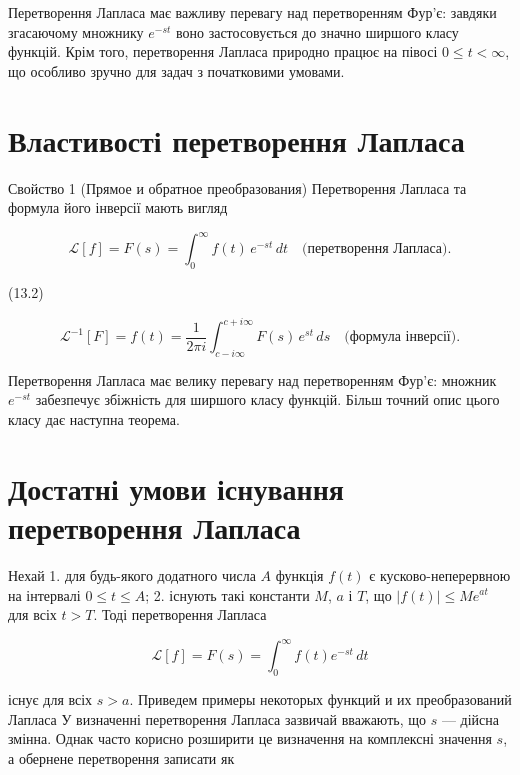 \documentclass[
  ukrainian,
]{article}
\begin{document}
Перетворення Лапласа має важливу перевагу над перетворенням Фур'є:
завдяки згасаючому множнику \(e^{-st}\) воно застосовується до значно
ширшого класу функцій. Крім того, перетворення Лапласа природно працює
на півосі \(0 \le t < \infty\), що особливо зручно для задач з
початковими умовами.

\section{Властивості перетворення
Лапласа}\label{ux432ux43bux430ux441ux442ux438ux432ux43eux441ux442ux456-ux43fux435ux440ux435ux442ux432ux43eux440ux435ux43dux43dux44f-ux43bux430ux43fux43bux430ux441ux430}

Свойство 1 (Прямое и обратное преобразования) Перетворення Лапласа та
формула його інверсії мають вигляд

\[
\mathscr{L}[f] = F(s) = \int_{0}^{\infty} f(t) \, e^{-st} \, dt
\quad \text{(перетворення Лапласа).}
\]

(13.2)

\[
\mathscr{L}^{-1}[F] = f(t) = \frac{1}{2\pi i} \int_{c-i\infty}^{c+i\infty} F(s) \, e^{st} \, ds
\quad \text{(формула інверсії).}
\]

Перетворення Лапласа має велику перевагу над перетворенням Фур'є:
множник \(e^{-st}\) забезпечує збіжність для ширшого класу функцій.
Більш точний опис цього класу дає наступна теорема.

\section{Достатні умови існування перетворення
Лапласа}\label{ux434ux43eux441ux442ux430ux442ux43dux456-ux443ux43cux43eux432ux438-ux456ux441ux43dux443ux432ux430ux43dux43dux44f-ux43fux435ux440ux435ux442ux432ux43eux440ux435ux43dux43dux44f-ux43bux430ux43fux43bux430ux441ux430}

Нехай 1. для будь-якого додатного числа \(A\) функція \(f(t)\) є
кусково-неперервною на інтервалі \(0 \le t \le A\); 2. існують такі
константи \(M\), \(a\) і \(T\), що \(|f(t)| \le Me^{at}\) для всіх
\(t > T\). Тоді перетворення Лапласа

\[
\mathscr{L}[f] = F(s) = \int_0^\infty f(t)e^{-st}\,dt
\]

існує для всіх \(s > a\). Приведем примеры некоторых функций и их
преобразований Лапласа У визначенні перетворення Лапласа зазвичай
вважають, що \(s\) --- дійсна змінна. Однак часто корисно розширити це
визначення на комплексні значення \(s\), а обернене перетворення
записати як
\end{document}
